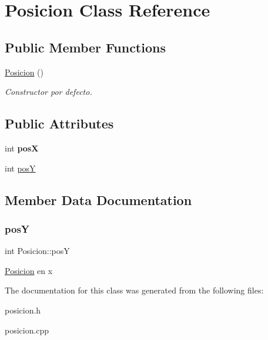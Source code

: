 \hypertarget{classPosicion}{}\section{Posicion Class Reference}
\label{classPosicion}
\subsection*{Public Member Functions}
\begin{DoxyCompactItemize}
\item 
\mbox{\label{classPosicion_a8d8e3f8286029269c1c19a16c9bd87a5}} 
\hyperlink{classPosicion_a8d8e3f8286029269c1c19a16c9bd87a5}{Posicion} ()
\begin{DoxyCompactList}\small\item\em Constructor por defecto. \end{DoxyCompactList}\end{DoxyCompactItemize}
\subsection*{Public Attributes}
\begin{DoxyCompactItemize}
\item 
\mbox{\label{classPosicion_a727e544cee2b0e3973e618df108f6a8f}} 
int {\bfseries posX}
\item 
int \hyperlink{classPosicion_a2156506a310d10a0f1edeff9863fd271}{posY}
\end{DoxyCompactItemize}


\subsection{Member Data Documentation}
\mbox{\label{classPosicion_a2156506a310d10a0f1edeff9863fd271}} 
\subsubsection{\texorpdfstring{posY}{posY}}
{\footnotesize\ttfamily int Posicion\+::posY}

\hyperlink{classPosicion}{Posicion} en x 

The documentation for this class was generated from the following files\+:\begin{DoxyCompactItemize}
\item 
posicion.\+h\item 
posicion.\+cpp\end{DoxyCompactItemize}
